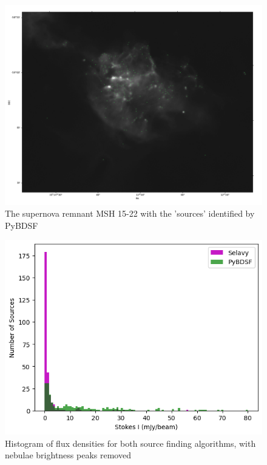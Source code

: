 \begin{figure}
    \centering
    \includegraphics[width=\linewidth]{Thesis_Template/Figures/MSH15-22 sources.png}
    \caption{The supernova remnant MSH 15-22 with the 'sources' identified by PyBDSF}
    \label{fig: snr sources}
\end{figure}

\begin{figure}
    \centering
    \includegraphics[width=\linewidth]{Thesis_Template/Figures/unmatched histogram.png}
    \caption{Histogram of flux densities for both source finding algorithms, with nebulae brightness peaks removed}
    \label{fig: unmatched histogram}
\end{figure}

